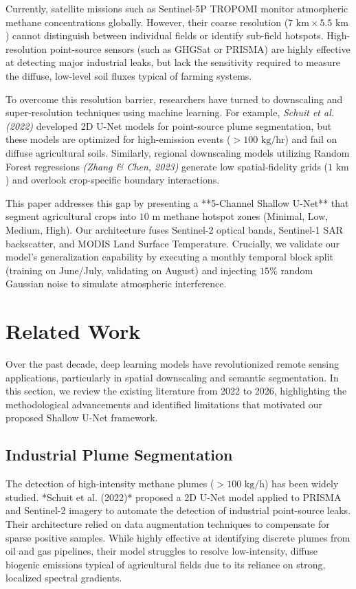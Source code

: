 \documentclass[final,3p,times,twocolumn]{elsarticle}
\begin{document}
Currently, satellite missions such as Sentinel-5P TROPOMI monitor atmospheric methane concentrations globally. However, their coarse resolution ($7\text{ km} \times 5.5\text{ km}$) cannot distinguish between individual fields or identify sub-field hotspots. High-resolution point-source sensors (such as GHGSat or PRISMA) are highly effective at detecting major industrial leaks, but lack the sensitivity required to measure the diffuse, low-level soil fluxes typical of farming systems. 

To overcome this resolution barrier, researchers have turned to downscaling and super-resolution techniques using machine learning. For example, \textit{Schuit et al. (2022)} developed 2D U-Net models for point-source plume segmentation, but these models are optimized for high-emission events ($>100\text{ kg/hr}$) and fail on diffuse agricultural soils. Similarly, regional downscaling models utilizing Random Forest regressions \textit{(Zhang \& Chen, 2023)} generate low spatial-fidelity grids ($1\text{ km}$) and overlook crop-specific boundary interactions.

This paper addresses this gap by presenting a **5-Channel Shallow U-Net** that segment agricultural crops into $10\text{ m}$ methane hotspot zones (Minimal, Low, Medium, High). Our architecture fuses Sentinel-2 optical bands, Sentinel-1 SAR backscatter, and MODIS Land Surface Temperature. Crucially, we validate our model's generalization capability by executing a monthly temporal block split (training on June/July, validating on August) and injecting $15\%$ random Gaussian noise to simulate atmospheric interference.

\section{Related Work}
Over the past decade, deep learning models have revolutionized remote sensing applications, particularly in spatial downscaling and semantic segmentation. In this section, we review the existing literature from 2022 to 2026, highlighting the methodological advancements and identified limitations that motivated our proposed Shallow U-Net framework.

\subsection{Industrial Plume Segmentation}
The detection of high-intensity methane plumes ($>100\text{ kg/h}$) has been widely studied. *Schuit et al. (2022)* proposed a 2D U-Net model applied to PRISMA and Sentinel-2 imagery to automate the detection of industrial point-source leaks. Their architecture relied on data augmentation techniques to compensate for sparse positive samples. While highly effective at identifying discrete plumes from oil and gas pipelines, their model struggles to resolve low-intensity, diffuse biogenic emissions typical of agricultural fields due to its reliance on strong, localized spectral gradients.
\end{document}
